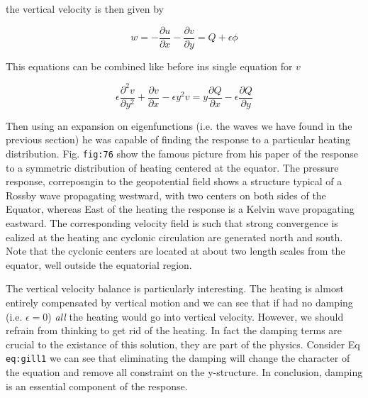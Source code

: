 the vertical velocity is then given by

\[w = -\frac{\partial u}{\partial x}-\frac{\partial v}{\partial y} = Q + \epsilon \phi\]

This equations can be combined like before ins single equation for \(v\)

\[\epsilon\frac{\partial^{2} v}{\partial y^{2}} + \frac{\partial v}{\partial x} -\epsilon y^2 v = y \frac{\partial Q}{\partial x} -\epsilon\frac{\partial Q}{\partial y}\]

Then using an expansion on eigenfunctions (i.e. the waves we have found
in the previous section) he was capable of finding the response to a
particular heating distribution. Fig. \texttt{fig:76} show the famous
picture from his paper of the response to a symmetric distribution of
heating centered at the equator. The pressure response, correposngin to
the geopotential field shows a structure typical of a Rossby wave
propagating westward, with two centers on both sides of the Equator,
whereas East of the heating the response is a Kelvin wave propagating
eastward. The corresponding velocity field is such that strong
convergence is ealized at the heating anc cyclonic circulation are
generated north and south. Note that the cyclonic centers are located at
about two length scales from the equator, well outside the equatorial
region.

The vertical velocity balance is particularly interesting. The heating
is almost entirely compensated by vertical motion and we can see that if
had no damping (i.e. \(\epsilon = 0\)) \emph{all} the heating would go
into vertical velocity. However, we should refrain from thinking to get
rid of the heating. In fact the damping terms are crucial to the
existance of this solution, they are part of the physics. Consider Eq
\texttt{eq:gill1} we can see that eliminating the damping will change
the character of the equation and remove all constraint on the
y-structure. In conclusion, damping is an essential component of the
response.

